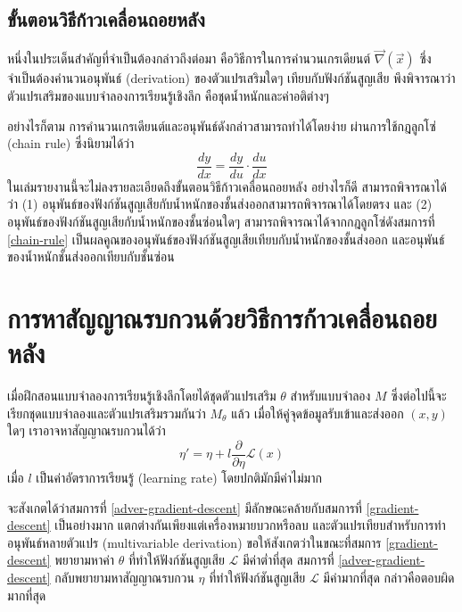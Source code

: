 \documentclass{cpereport}
\begin{document}
\subsection{ขั้นตอนวิธีก้าวเคลื่อนถอยหลัง}

หนึ่งในประเด็นสำคัญที่จำเป็นต้องกล่าวถึงต่อมา คือวิธีการในการคำนวนเกรเดียนต์ $\vec{\nabla}(\vec{x})$ ซึ่งจำเป็นต้องคำนวนอนุพันธ์ (derivation) ของตัวแปรเสริมใดๆ เทียบกับฟังก์ชันสูญเสีย พึงพิจารณาว่าตัวแปรเสริมของแบบจำลองการเรียนรู้เชิงลึก คือชุดน้ำหนักและค่าอติต่างๆ

อย่างไรก็ตาม การคำนวนเกรเดียนต์และอนุพันธ์ดังกล่าวสามารถทำได้โดยง่าย ผ่านการใช้กฎลูกโซ่ (chain rule) ซึ่งนิยามได้ว่า
\begin{equation}
    \frac{dy}{dx} = \frac{dy}{du} \cdot \frac{du}{dx}
    \label{chain-rule}
\end{equation}
ในเล่มรายงานนี้จะไม่ลงรายละเอียดถึงขั้นตอนวิธีก้าวเคลื่อนถอยหลัง อย่างไรก็ดี สามารถพิจารณาได้ว่า (1) อนุพันธ์ของฟังก์ชันสูญเสียกับน้ำหนักของชั้นส่งออกสามารถพิจารณาได้โดยตรง และ (2) อนุพันธ์ของฟังก์ชันสูญเสียกับน้ำหนักของชั้นซ่อนใดๆ สามารถพิจารณาได้จากกฎลูกโซ่ดังสมการที่ \ref{chain-rule} เป็นผลคูณของอนุพันธ์ของฟังก์ชันสูญเสียเทียบกับน้ำหนักของชั้นส่งออก และอนุพันธ์ของน้ำหนักชั้นส่งออกเทียบกับชั้นซ่อน

\section{การหาสัญญาณรบกวนด้วยวิธีการก้าวเคลื่อนถอยหลัง}

เมื่อฝึกสอนแบบจำลองการเรียนรู้เชิงลึกโดยได้ชุดตัวแปรเสริม $\theta$ สำหรับแบบจำลอง $M$ ซึ่งต่อไปนี้จะเรียกชุดแบบจำลองและตัวแปรเสริมรวมกันว่า $M_\theta$ แล้ว เมื่อให้คู่จุดข้อมูลรับเข้าและส่งออก $(x, y)$ ใดๆ เราอาจหาสัญญาณรบกวนได้ว่า
\begin{equation}
    \eta' = \eta + l \frac{\partial}{\partial \eta} \mathscr{L}\left( x \right)
    \label{adver-gradient-descent}
\end{equation}
เมื่อ $l$ เป็นค่าอัตราการเรียนรู้ (learning rate) โดยปกติมักมีค่าไม่มาก

จะสังเกตได้ว่าสมการที่ \ref{adver-gradient-descent} มีลักษณะคล้ายกับสมการที่ \ref{gradient-descent} เป็นอย่างมาก แตกต่างกันเพียงแต่เครื่องหมายบวกหรือลบ และตัวแปรเทียบสำหรับการทำอนุพันธ์หลายตัวแปร (multivariable derivation) ขอให้สังเกตว่าในขณะที่สมการ \ref{gradient-descent} พยายามหาค่า $\theta$ ที่ทำให้ฟังก์ชันสูญเสีย $\mathscr{L}$ มีค่าต่ำที่สุด สมการที่ \ref{adver-gradient-descent} กลับพยายามหาสัญญาณรบกวน $\eta$ ที่ทำให้ฟังก์ชันสูญเสีย $\mathscr{L}$ มีค่ามากที่สุด กล่าวคือตอบผิดมากที่สุด
\end{document}
